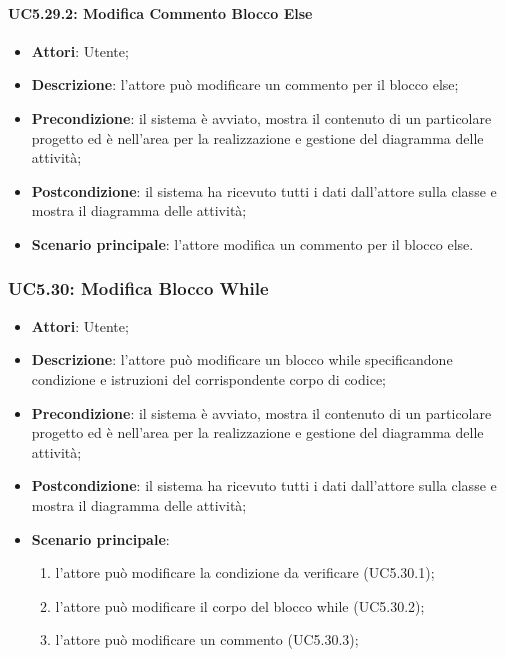 \paragraph{UC5.29.2: Modifica Commento Blocco Else}
\label{UC5.29.2}
\begin{itemize}
	\item \textbf{Attori}: Utente;
	\item \textbf{Descrizione}: l'attore può modificare un commento per il blocco else;
	\item \textbf{Precondizione}: il sistema è avviato, mostra il contenuto di un particolare progetto ed è nell'area per la realizzazione e gestione del diagramma delle attività;
	\item \textbf{Postcondizione}: il sistema ha ricevuto tutti i dati dall'attore sulla classe e mostra il diagramma delle attività;
	\item \textbf{Scenario principale}: l'attore modifica un commento per il blocco else.
\end{itemize}

\subsubsection{UC5.30: Modifica Blocco While}
\label{UC5.30}
\begin{itemize}
	\item \textbf{Attori}: Utente;
	\item \textbf{Descrizione}: l'attore può modificare un blocco while specificandone condizione e istruzioni del corrispondente corpo di codice;
	\item \textbf{Precondizione}: il sistema è avviato, mostra il contenuto di un particolare progetto ed è nell'area per la realizzazione e gestione del diagramma delle attività;
	\item \textbf{Postcondizione}: il sistema ha ricevuto tutti i dati dall'attore sulla classe e mostra il diagramma delle attività;
	\item \textbf{Scenario principale}:
	\begin{enumerate}
		\item l'attore può modificare la condizione da verificare (UC5.30.1);
		\item l'attore può modificare il corpo del blocco while (UC5.30.2);
		\item l'attore può modificare un commento (UC5.30.3);
	\end{enumerate}
\end{itemize}

